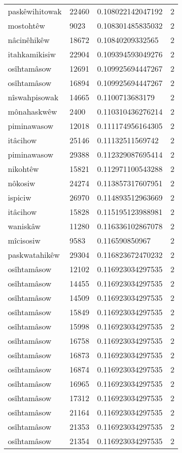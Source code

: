 \begin{longtable}{llll}
paskêwihitowak & 22460 & 0.108022142047192 & 2 \\
mostohtêw & 9023 & 0.108301485835032 & 2 \\
nâcinêhikêw & 18672 & 0.10840209332565 & 2 \\
itahkamikisiw & 22904 & 0.109394593049276 & 2 \\
osîhtamâsow & 12691 & 0.109925694447267 & 2 \\
osîhtamâsow & 16894 & 0.109925694447267 & 2 \\
nîswahpisowak & 14665 & 0.1100713683179 & 2 \\
mônahaskwêw & 2400 & 0.110310436276214 & 2 \\
piminawasow & 12018 & 0.111174956164305 & 2 \\
itâcihow & 25146 & 0.11132511569742 & 2 \\
piminawasow & 29388 & 0.112329087695414 & 2 \\
nikohtêw & 15821 & 0.112971100543288 & 2 \\
nôkosiw & 24274 & 0.113857317607951 & 2 \\
ispiciw & 26970 & 0.114893512963669 & 2 \\
itâcihow & 15828 & 0.115195123988981 & 2 \\
waniskâw & 11280 & 0.116336102867078 & 2 \\
mîcisosiw & 9583 & 0.116590850967 & 2 \\
paskwatahikêw & 29304 & 0.116823672470232 & 2 \\
osîhtamâsow & 12102 & 0.116923034297535 & 2 \\
osîhtamâsow & 14455 & 0.116923034297535 & 2 \\
osîhtamâsow & 14509 & 0.116923034297535 & 2 \\
osîhtamâsow & 15849 & 0.116923034297535 & 2 \\
osîhtamâsow & 15998 & 0.116923034297535 & 2 \\
osîhtamâsow & 16758 & 0.116923034297535 & 2 \\
osîhtamâsow & 16873 & 0.116923034297535 & 2 \\
osîhtamâsow & 16874 & 0.116923034297535 & 2 \\
osîhtamâsow & 16965 & 0.116923034297535 & 2 \\
osîhtamâsow & 17312 & 0.116923034297535 & 2 \\
osîhtamâsow & 21164 & 0.116923034297535 & 2 \\
osîhtamâsow & 21353 & 0.116923034297535 & 2 \\
osîhtamâsow & 21354 & 0.116923034297535 & 2 \\

\end{longtable}
